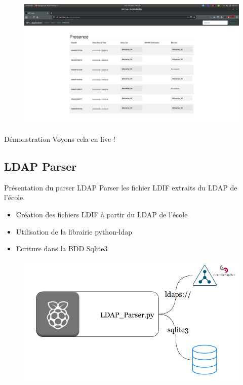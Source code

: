 \documentclass[aspectratio=169]{beamer}
\begin{document}
\begin{frame}
    \begin{figure}
        \centering
        \includegraphics[height=.9\textheight]{../assets/capture_page_presence.png}
    \end{figure}
\end{frame}

\begin{frame}{Démonstration}
    Voyons cela en live ! 
\end{frame}

\subsection{LDAP Parser}

\begin{frame}{Présentation du parser LDAP}
    Parser les fichier LDIF extraits du LDAP de l'école.
    \begin{itemize}
        \item Création des fichiers LDIF à partir du LDAP de l'école
        \item Utilisation de la librairie python-ldap
        \item Ecriture dans la BDD Sqlite3
    \end{itemize}
    \begin{figure}
        \centering
        \includegraphics[width=.45\textwidth]{../assets/ldapparserarchitecture.png}
    \end{figure}
\end{frame}
\end{document}
